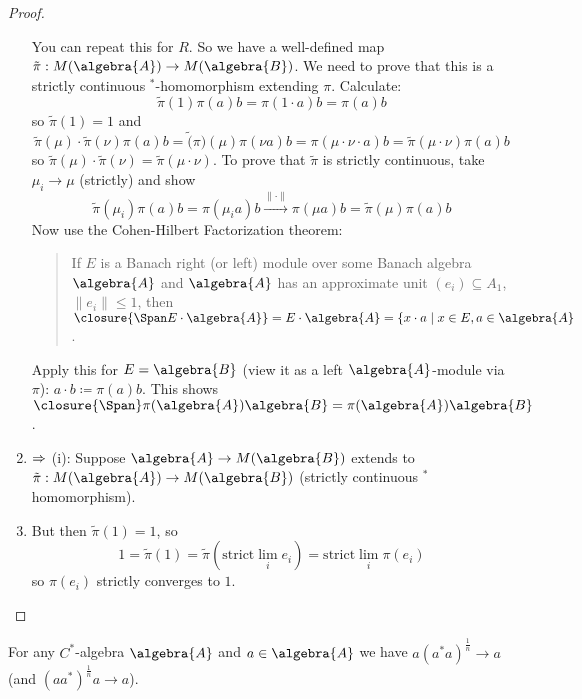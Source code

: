 \documentclass[a4paper]{article}
\begin{document}
\begin{proof}
\begin{enumerate}
		You can repeat this for $R$. So we have a well-defined map $\tilde{\pi}: M(\algebra{A}) \to M(\algebra{B})$.
		We need to prove that this is a strictly continuous $^*$-homomorphism extending $\pi$.
		Calculate:
		\begin{equation*}
			\tilde{\pi}(1) \pi(a) b = \pi(1 \cdot a) b = \pi(a) b
		\end{equation*}
		so $\tilde{\pi}(1) = 1$ and 
		\begin{equation*}
			\tilde{\pi}(\mu) \cdot \tilde{\pi}(\nu) \pi(a) b = \tilde(\pi)(\mu) \pi(\nu a) b = \pi(\mu \cdot \nu \cdot a) b = \tilde{\pi}(\mu \cdot \nu) \pi(a) b
		\end{equation*}
		so $\tilde{\pi}(\mu) \cdot \tilde{\pi}(\nu) = \tilde{\pi}(\mu \cdot \nu)$.
		To prove that $\tilde{\pi}$ is strictly continuous, take $\mu_i \to \mu$ (strictly) and show
		\begin{equation*}
			\tilde{\pi}(\mu_i) \pi(a) b = \pi(\mu_i a) b \xrightarrow{\| \cdot \|} \pi(\mu a) b = \tilde{\pi}(\mu) \pi(a) b
		\end{equation*}
		Now use the Cohen-Hilbert Factorization theorem:
		\begin{quote}
			If $E$ is a Banach right (or left) module over some Banach algebra $\algebra{A}$ and $\algebra{A}$ has an approximate unit $(e_i) \subseteq A_1$, $\|e_i\| \leq 1$, then $\closure{\Span E \cdot \algebra{A}} = E \cdot \algebra{A} = \{x \cdot a \mid x \in E, a \in \algebra{A}$.
		\end{quote}
		Apply this for $E = \algebra{B}$ (view it as a left $\algebra{A}$-module via $\pi$): $a \cdot b \coloneq \pi(a) b$.
		This shows $\closure{\Span} \pi(\algebra{A}) \algebra{B} = \pi(\algebra{A}) \algebra{B}$. 
		\item $\Rightarrow$ (i): Suppose $\algebra{A} \to M(\algebra{B})$ extends to $\tilde{\pi}: M(\algebra{A}) \to M(\algebra{B})$ (strictly continuous $^*$ homomorphism).
		\item But then $\tilde{\pi}(1) = 1$, so
		\begin{equation*}
			1 = \tilde{\pi}(1) = \tilde{\pi}(\mathrm{strict }\lim_i e_i) = \mathrm{strict }\lim_i \pi(e_i) 
		\end{equation*}
		so $\pi(e_i)$ strictly converges to $1$.
	\end{enumerate}
\end{proof}


\begin{exercise}[03-01]
	For any $C^*$-algebra $\algebra{A}$ and $a \in \algebra{A}$ we have $a (a^* a)^{\frac{1}{n}} \to a$ (and $(a a^*)^{\frac{1}{n}} a \to a$).
\end{exercise}
\end{document}
